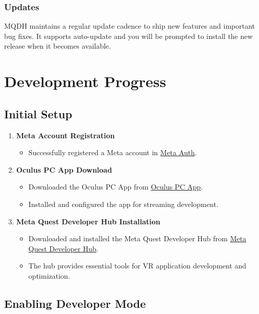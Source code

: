 \documentclass{article}
\begin{document}
\subsubsection{Updates}

MQDH maintains a regular update cadence to ship new features and important bug fixes. It supports auto-update and you will be prompted to install the new release when it becomes available.

\section{Development Progress}

\subsection{Initial Setup}

\begin{enumerate}
    \item \textbf{Meta Account Registration}
    \begin{itemize}
        \item Successfully registered a Meta account in \href{https://auth.meta.com/}{Meta Auth}.
    \end{itemize}

    \item \textbf{Oculus PC App Download}
    \begin{itemize}
        \item Downloaded the Oculus PC App from \href{https://www.oculus.com/download_app/?id=1582076955407037}{Oculus PC App}.
        \item Installed and configured the app for streaming development.
    \end{itemize}

    \item \textbf{Meta Quest Developer Hub Installation}
    \begin{itemize}
        \item Downloaded and installed the Meta Quest Developer Hub from \href{https://developer.oculus.com/downloads/package/oculus-developer-hub-win/}{Meta Quest Developer Hub}.
        \item The hub provides essential tools for VR application development and optimization.
    \end{itemize}
\end{enumerate}

\subsection{Enabling Developer Mode}
\end{document}
